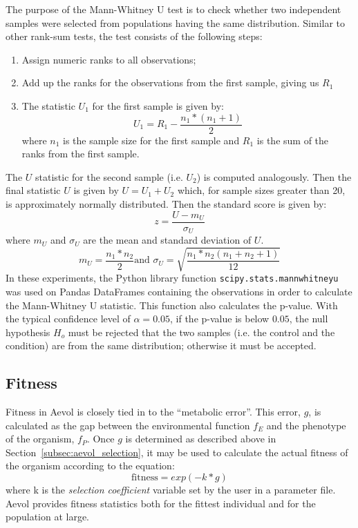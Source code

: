 The purpose of the Mann-Whitney U test is to check whether two independent samples were selected from populations having the same distribution. Similar to other rank-sum tests, the test consists of the following steps:
\begin{enumerate}
	\item Assign numeric ranks to all observations;
	\item Add up the ranks for the observations from the first sample, giving us $R_1$
	\item The statistic $U_1$ for the first sample is given by:
	\begin{equation*}
	U_1 = R_1 - \frac{n_1*(n_1 + 1)}{2}
	\end{equation*}
	where $n_1$ is the sample size for the first sample and $R_1$ is the sum of the ranks from the first sample.
\end{enumerate}
The $U$ statistic for the second sample (i.e. $U_2$) is computed analogously. Then the final statistic $U$ is given by $U = U_1 + U_2$ which, for sample sizes greater than 20, is approximately normally distributed. Then the standard score is given by:
\begin{equation*}
z = \frac{U - m_U}{\sigma_U}
\end{equation*}
where $m_U$ and $\sigma_U$ are the mean and standard deviation of $U$.
\begin{equation*}
m_U = \frac{n_1*n_2}{2} \text{and } \sigma_U = \sqrt{\frac{n_1*n_2\left(n_1 + n_2 +1\right)}{12}}
\end{equation*} In these experiments, the Python library function \texttt{scipy.stats.mannwhitneyu} was used on Pandas DataFrames containing the observations in order to calculate the Mann-Whitney U statistic. This function also calculates the p-value. With the typical confidence level of $\alpha = 0.05$, if the p-value is below $0.05$, the null hypothesis $H_o$ must be rejected that the two samples (i.e. the control and the condition) are from the same distribution; otherwise it must be accepted.

\subsection{Fitness}
Fitness in Aevol is closely tied in to the ``metabolic error''. This error, $g$, is calculated as the gap between the environmental function $f_E$ and the phenotype of the organism, $f_P$. Once $g$ is determined as described above in Section~\ref{subsec:aevol_selection}, it may be used to calculate the actual fitness of the organism according to the equation:
\begin{equation*}
\text{fitness} = exp(-k*g)
\end{equation*} 
where k is the \textit{selection coefficient} variable set by the user in a parameter file. Aevol provides fitness statistics both for the fittest individual and for the population at large.
